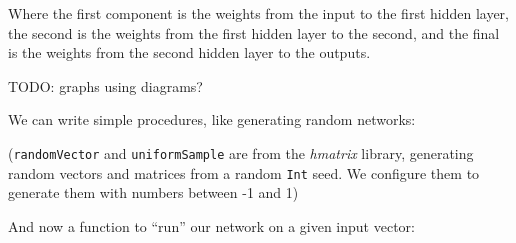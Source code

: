 \documentclass[]{article}
\newenvironment{Shaded}{}{}
\newcommand{\KeywordTok}[1]{\textcolor[rgb]{0.00,0.44,0.13}{\textbf{{#1}}}}
\newcommand{\DataTypeTok}[1]{\textcolor[rgb]{0.56,0.13,0.00}{{#1}}}
\newcommand{\DecValTok}[1]{\textcolor[rgb]{0.25,0.63,0.44}{{#1}}}
\newcommand{\CommentTok}[1]{\textcolor[rgb]{0.38,0.63,0.69}{\textit{{#1}}}}
\newcommand{\OtherTok}[1]{\textcolor[rgb]{0.00,0.44,0.13}{{#1}}}
\newcommand{\FunctionTok}[1]{\textcolor[rgb]{0.02,0.16,0.49}{{#1}}}
\newcommand{\NormalTok}[1]{{#1}}
\begin{document}
Where the first component is the weights from the input to the first
hidden layer, the second is the weights from the first hidden layer to
the second, and the final is the weights from the second hidden layer to
the outputs.

TODO: graphs using diagrams?

We can write simple procedures, like generating random networks:

\begin{Shaded}
\end{Shaded}

(\texttt{randomVector} and \texttt{uniformSample} are from the
\emph{hmatrix} library, generating random vectors and matrices from a
random \texttt{Int} seed. We configure them to generate them with
numbers between -1 and 1)

And now a function to ``run'' our network on a given input vector:
\end{document}
